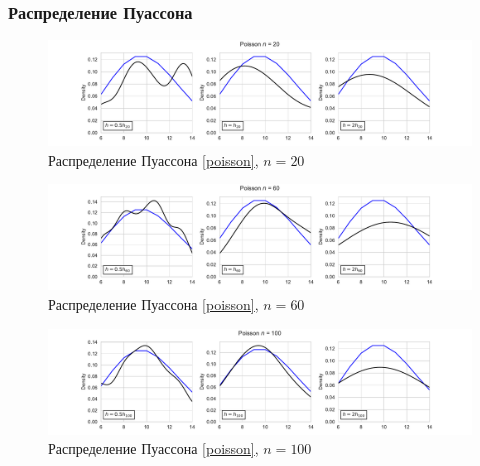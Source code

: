 \documentclass[a4paper]{article}
\begin{document}
\subsubsection{Распределение Пуассона}
\begin{figure}[H]
    \centering
    \includegraphics[width = 16 cm]{resources/poisKde20.pdf}
    \caption{Распределение Пуассона \eqref{poisson}, $n = 20$}
    \label{fig:poissonKDE20}
\end{figure}
\begin{figure}[H]
    \centering
    \includegraphics[width = 16 cm]{resources/poisKde60.pdf}
    \caption{Распределение Пуассона \eqref{poisson}, $n = 60$}
    \label{fig:poissonKDE60}
\end{figure}
\begin{figure}[H]
    \centering
    \includegraphics[width = 16 cm]{resources/poisKde100.pdf}
    \caption{Распределение Пуассона \eqref{poisson}, $n = 100$}
    \label{fig:poissonKDE100}
\end{figure}
\end{document}
